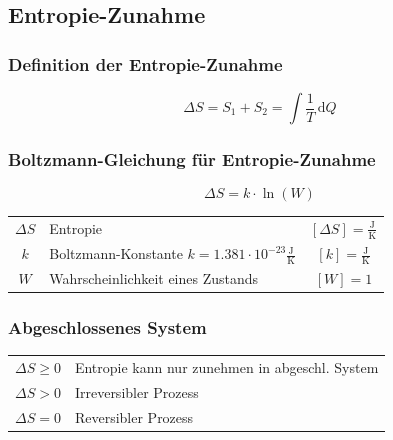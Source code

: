 \vfill\null
\columnbreak


\subsection{Entropie-Zunahme}

\subsubsection{Definition der Entropie-Zunahme}

$$ \Delta S = S_1 + S_2 = \int \frac{1}{T} \, \mathrm{d}Q  $$


\subsubsection{Boltzmann-Gleichung für Entropie-Zunahme}

$$ \boxed{ \Delta S = k \cdot \ln(W) }$$



\begin{tabular}{c l c}
	\rule{0pt}{10pt}$\Delta S$ & Entropie & $[\Delta S] = \mathrm{\frac{J}{K}}$ \\
	\rule{0pt}{10pt}$k$ & Boltzmann-Konstante $k = 1.381 \cdot 10^{-23} \mathrm{\frac{J}{K}}$ & $[k] = \mathrm{\frac{J}{K}}$ \\
	$W$ & Wahrscheinlichkeit eines Zustands & $[W] = 1$ \\
\end{tabular}


\subsubsection{Abgeschlossenes System}

\begin{tabular}{ll}
$ \Delta S \geq 0$ & Entropie kann nur zunehmen in abgeschl. System \\

$ \Delta S > 0$ & Irreversibler Prozess \\

$ \Delta S = 0$ & Reversibler Prozess \\
\end{tabular}

